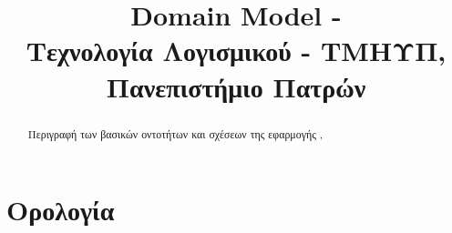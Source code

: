 

\fancyhead[R]{\leftmark}

\title{
    Domain Model - \appname\\[1ex]
    \large Τεχνολογία Λογισμικού - ΤΜΗΥΠ, Πανεπιστήμιο Πατρών \\[2ex]
}



\maketitle
\thispagestyle{empty}
\newpage

\tableofcontents
\newpage

\begin{abstract}
    Περιγραφή των βασικών οντοτήτων και σχέσεων της εφαρμογής \appname,
\end{abstract}

\newpage

\section{Ορολογία}

